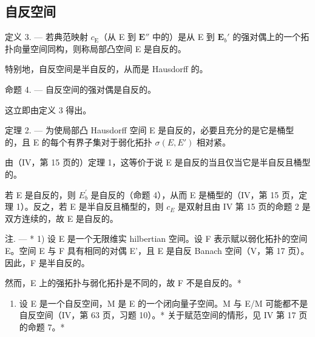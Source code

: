 \subsection{自反空间}

定义 3. --- 若典范映射 \(c_{\mathrm{E}}\)（从 E 到 \(\mathbf{E}''\) 中的）是从 E 到 \(\mathbf{E}_b'\) 的强对偶上的一个拓扑向量空间同构，则称局部凸空间 E 是自反的。

特别地，自反空间是半自反的，从而是 Hausdorff 的。

命题 4. --- 自反空间的强对偶是自反的。

这立即由定义 3 得出。

定理 2. --- 为使局部凸 Hausdorff 空间 E 是自反的，必要且充分的是它是桶型的，且 E 的每个有界子集对于弱化拓扑 \(\sigma(E, E')\) 相对紧。

由（IV，第 15 页的）定理 1，这等价于说 E 是自反的当且仅当它是半自反且桶型的。

若 E 是自反的，则 \(E_{b}^{\prime}\) 是自反的（命题 4），从而 E 是桶型的（IV，第 15 页，定理 1）。反之，若 E 是半自反且桶型的，则 \(c_{E}\) 是双射且由 IV 第 15 页的命题 2 是双方连续的，故 E 是自反的。

注. --- * 1) 设 E 是一个无限维实 hilbertian 空间。设 F 表示赋以弱化拓扑的空间 E。空间 E 与 F 具有相同的对偶 E'，且 E 是自反 Banach 空间（V，第 17 页）。因此，F 是半自反的。

然而，E 上的强拓扑与弱化拓扑是不同的，故 F 不是自反的。*

\begin{enumerate}
\def\labelenumi{\arabic{enumi})}
\setcounter{enumi}{1}
\tightlist
\item
  设 E 是一个自反空间，M 是 E 的一个闭向量子空间。M 与 E/M 可能都不是自反空间（IV，第 63 页，习题 10）。* 关于赋范空间的情形，见 IV 第 17 页的命题 7。*
\end{enumerate}

